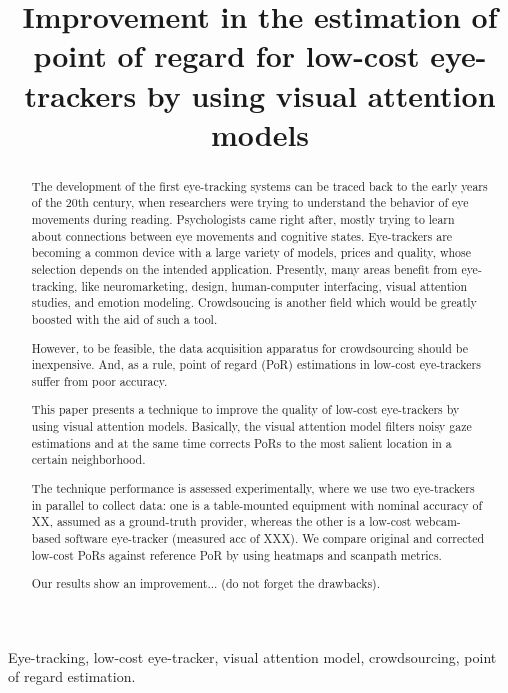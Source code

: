 \documentclass{article}
\title{Improvement in the estimation of point of regard for low-cost eye-trackers by using visual attention models}
\begin{document}
%
\maketitle
%
\begin{abstract}
	The development of the first eye-tracking systems can be traced back to the early years of the 20th century, when researchers were trying to understand the behavior of eye movements during reading. Psychologists came right after, mostly trying to learn about connections between eye movements and cognitive states. Eye-trackers are becoming a common device with a large variety of models, prices and quality, whose selection depends on the intended application. Presently, many areas benefit from eye-tracking, like neuromarketing, design, human-computer interfacing, visual attention studies, and emotion modeling. Crowdsoucing is another field which would be greatly boosted with the aid of such a tool.

	 However, to be feasible, the data acquisition apparatus for crowdsourcing should be inexpensive. And, as a rule, point of regard (PoR) estimations in low-cost eye-trackers suffer from poor accuracy. %
	
	This paper presents a technique to improve the quality of low-cost eye-trackers by using visual attention models. Basically, the visual attention model filters noisy gaze estimations and at the same time corrects PoRs to the most salient location in a certain neighborhood.
	
	The technique performance is assessed experimentally, where we use two eye-trackers in parallel to collect data: one is a table-mounted equipment with nominal accuracy of XX, assumed as a ground-truth provider, whereas the other is a low-cost webcam-based software eye-tracker (measured acc of XXX). We compare original and corrected low-cost PoRs against reference PoR by using heatmaps and scanpath metrics.

	Our results show an improvement... (do not forget the drawbacks).


\end{abstract}
%
\begin{keywords}
	Eye-tracking, low-cost eye-tracker, visual attention model, crowdsourcing, point of regard estimation.
\end{keywords}
%
\end{document}
